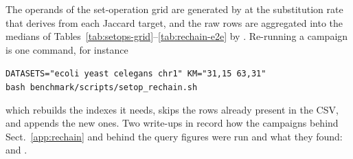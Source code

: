 \documentclass[runningheads,a4paper]{llncs}
\newif\ifrevmarkup\revmarkupfalse
\newenvironment{revblock}{\ifrevmarkup\color{blue}\fi}{}
\begin{document}
\begin{revblock}
The operands of the set-operation grid are generated by  at the substitution rate that  derives from each Jaccard target, and the raw rows are aggregated into the medians of Tables~\ref{tab:setops-grid}--\ref{tab:rechain-e2e} by . Re-running a campaign is one command, for instance
\begin{center}
\small\texttt{DATASETS="ecoli yeast celegans chr1" KM="31,15 63,31"}\\
\small\texttt{bash benchmark/scripts/setop\_rechain.sh}
\end{center}
which rebuilds the indexes it needs, skips the rows already present in the CSV, and appends the new ones. Two write-ups in  record how the campaigns behind Sect.~\ref{app:rechain} and behind the query figures were run and what they found:  and .
\end{revblock}



\end{document}
